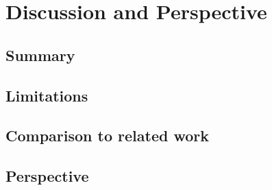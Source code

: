 \section{Discussion and Perspective}
\subsection{Summary}
\subsection{Limitations}
\subsection{Comparison to related work}
\subsection{Perspective}